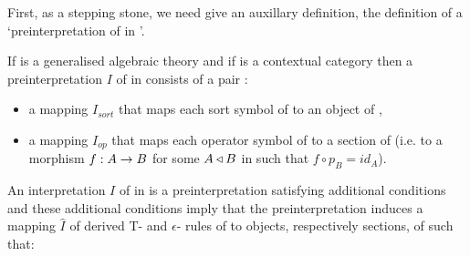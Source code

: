 \newpage
\note
First, as a stepping stone, we need  give an auxillary definition, the definition of  a `preinterpretation of \gatUw in \catc'.

\newcommand{\Isort}{I_{sort}}
\newcommand{\Iop}{I_{op}}
\newcommand {\Ihat}{\hat{I}}
\note 
If \gatU is a generalised algebraic theory  and if \catcw is a contextual category then
a preinterpretation $I$ of  \gatU in \catcw consists of a pair :
\begin{itemize}
\item a mapping $\Isort$ that maps each sort symbol of \gatUw to  an object of \catc,
\item a mapping $\Iop$ that maps each operator symbol of \gatUw to a section of \catcw (i.e. to a morphism $f: A \rightarrow B$ for some 
$A \triangleleft B$ in \catcw such that $f \circ p_B=id_A$).
\end{itemize}

\note 
An interpretation $I$ of \gatUw in \catcw is a preinterpretation satisfying additional conditions and these 
additional conditions imply that the preinterpretation induces a mapping $\hat{I}$
of derived T- and $\epsilon$- rules of \gatUw to objects, respectively sections, of \gatUw such that:


